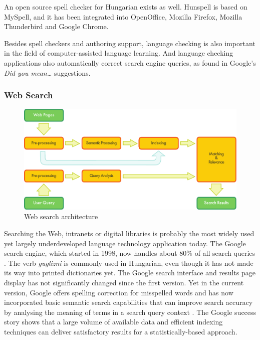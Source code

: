 \begin{multicols}{2}
  An open source spell checker for Hungarian exists as well. Hunspell \cite{hunspell} is based on MySpell, and it has been integrated into OpenOffice, Mozilla Firefox, Mozilla Thunderbird and Google Chrome.

  Besides spell checkers and authoring support, language checking is also important in the field of computer-assisted language learning. And language checking applications also automatically correct search engine queries, as found in Google's \textit{Did you mean\dots} suggestions.

  \subsubsection{Web Search}

  \begin{figure}[htb]
    \center
    \includegraphics[width=\textwidth]{../_media/english/web_search_architecture}
    \caption{Web search architecture}
    \label{fig:websearcharch_en}
   \end{figure}

  Searching the Web, intranets or digital libraries is probably the most widely used yet largely underdeveloped language technology application today. The Google search engine, which started in 1998, now handles about 80\% of all search queries \cite{spi1}. The verb \textit{guglizni} is commonly used in Hungarian, even though it has not made its way into printed dictionaries yet. The Google search interface and results page display has not significantly changed since the first version. Yet in the current version, Google offers spelling correction for misspelled words and has now incorporated basic semantic search capabilities that can improve search accuracy by analysing the meaning of terms in a search query context \cite{pc1}. The Google success story shows that a large volume of available data and efficient indexing techniques can deliver satisfactory results for a statistically-based approach.  


\end{multicols}
